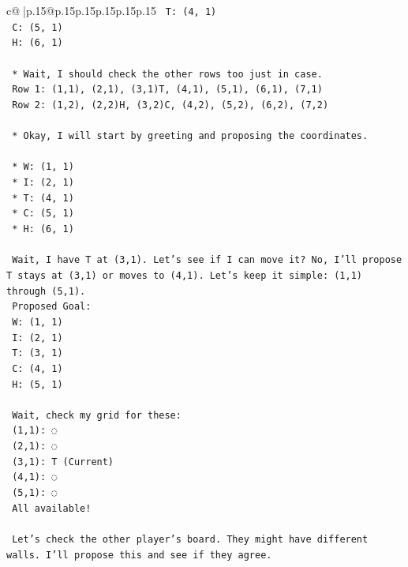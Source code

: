 \documentclass{article}
\begin{document}
{\begin{supertabular}{c@{$\;$}|p{.15\linewidth}@{}p{.15\linewidth}p{.15\linewidth}p{.15\linewidth}p{.15\linewidth}p{.15\linewidth}}
{{{\texttt{        T: (4, 1)} \\
\texttt{        C: (5, 1)} \\
\texttt{        H: (6, 1)} \\
\\ 
\texttt{    *   Wait, I should check the other rows too just in case.} \\
\texttt{        Row 1: (1,1), (2,1), (3,1)T, (4,1), (5,1), (6,1), (7,1)} \\
\texttt{        Row 2: (1,2), (2,2)H, (3,2)C, (4,2), (5,2), (6,2), (7,2)} \\
\\ 
\texttt{    *   Okay, I will start by greeting and proposing the coordinates.} \\
\\ 
\texttt{    *   W: (1, 1)} \\
\texttt{    *   I: (2, 1)} \\
\texttt{    *   T: (4, 1)} \\
\texttt{    *   C: (5, 1)} \\
\texttt{    *   H: (6, 1)} \\
\\ 
\texttt{    Wait, I have T at (3,1). Let's see if I can move it? No, I'll propose T stays at (3,1) or moves to (4,1). Let's keep it simple: (1,1) through (5,1).} \\
\texttt{    Proposed Goal:} \\
\texttt{    W: (1, 1)} \\
\texttt{    I: (2, 1)} \\
\texttt{    T: (3, 1)} \\
\texttt{    C: (4, 1)} \\
\texttt{    H: (5, 1)} \\
\\ 
\texttt{    Wait, check my grid for these:} \\
\texttt{    (1,1): ◌} \\
\texttt{    (2,1): ◌} \\
\texttt{    (3,1): T (Current)} \\
\texttt{    (4,1): ◌} \\
\texttt{    (5,1): ◌} \\
\texttt{    All available!} \\
\\ 
\texttt{    Let's check the other player's board. They might have different walls. I'll propose this and see if they agree.} \\
\\ 
}}}
\end{supertabular}}
\end{document}

